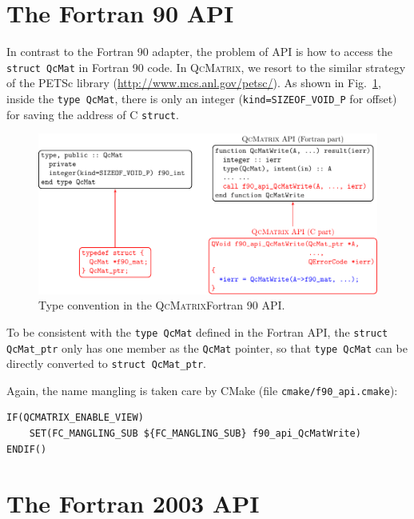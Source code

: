\documentclass[a4paper,11pt,twoside,openright]{book}
\begin{document}
\section{The Fortran 90 API}
\label{section-F90-API}

In contrast to the Fortran 90 adapter, the problem of API is how to access the
\verb|struct QcMat| in Fortran 90 code. In \textsc{QcMatrix}, we resort to the similar
strategy of the PETSc library (\url{http://www.mcs.anl.gov/petsc/}). As shown in
Fig.~\ref{fig-F90-API-type}, inside the \verb|type QcMat|, there is only an integer
(\verb|kind=SIZEOF_VOID_P| for offset) for saving the address of C \verb|struct|.
\begin{figure}[hbtp]
  \centering
  \includegraphics[width=16cm]{F90_api_type.pdf}
  \caption{Type convention in the \textsc{QcMatrix}Fortran 90 API.}
  \label{fig-F90-API-type}
\end{figure}

To be consistent with the \verb|type QcMat| defined in the Fortran API, the
\verb|struct QcMat_ptr| only has one member as the \verb|QcMat| pointer, so that
\verb|type QcMat| can be directly converted to \verb|struct QcMat_ptr|.

Again, the name mangling is taken care by CMake (file \verb|cmake/f90_api.cmake|):
\begin{verbatim}
IF(QCMATRIX_ENABLE_VIEW)
    SET(FC_MANGLING_SUB ${FC_MANGLING_SUB} f90_api_QcMatWrite)
ENDIF()
\end{verbatim}

\section{The Fortran 2003 API}
\label{section-F03-API}
\end{document}
